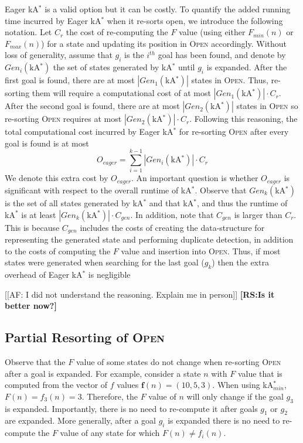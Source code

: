 \documentclass{aicom2e}
\newcommand{\kastar}{kA$^*$}
\newcommand{\kastarmin}{kA$^*_{min}$}
\newcommand{\minf}{$F_{min}(n)$}
\newcommand{\maxf}{$F_{max}(n)$}
\newcommand{\open}{\textsc{Open}}
\newcommand{\roni}[1]{\textbf{[RS:#1]}}
\begin{document}
Eager \kastar{} is a valid option but it can be costly. To quantify the added running time 
incurred by Eager \kastar{} when it re-sorts open, we introduce the following notation. 
Let $C_r$ the cost of re-computing the $F$ value (using either \minf{} or \maxf{}) for a state and updating its position in \open{} accordingly. Without loss of generality, assume that $g_i$ is the  $i^{th}$ goal has been found, and denote by $Gen_i(\text{\kastar{}})$ the set of  states generated by \kastar{} until $g_i$ is expanded. After the first goal is found, there are at most $|Gen_1(\text{\kastar{}})|$ states in \open{}. Thus, re-sorting them will require a computational cost of at most $|Gen_1(\text{\kastar{}})|\cdot C_r$. After the second goal is found, there
are at most $|Gen_2(\text{\kastar{}})|$ states in \open{} so re-sorting \open{} requires at most
$|Gen_2(\text{\kastar{}})|\cdot C_r$. Following this reasoning, the total computational
cost incurred by Eager \kastar{} for re-sorting \open{} after every goal is found is at most
\begin{equation}
O_{eager}=\sum_{i=1}^{k-1} |Gen_i(\text{\kastar{}})|\cdot C_r
\label{eq:re-sort-cost}
\end{equation}
We denote this extra cost by $O_{eager}$. 
An important question is whether $O_{eager}$ is significant with respect to the overall runtime of \kastar{}. Observe that $Gen_k(\text{\kastar{}})$ is the set of all states generated by \kastar{} 
and that \kastar{}, and thus the runtime of \kastar{} is at least 
$|Gen_k(\text{\kastar{}})|\cdot C_{gen}$. 
In addition, note that $C_{gen}$ is larger than $C_r$. 
This is because $C_{gen}$ includes the costs of creating the data-structure for representing the generated state and performing duplicate detection, 
in addition to the costs of computing the $F$ value and insertion into \open{}. 
Thus, if most states were generated when searching for the last goal ($g_k$) 
then the extra overhead of Eager \kastar{} is negligible 

[[AF: I did not understand the reasoning. Explain me in person]]
\roni{Is it better now?}

\subsection{Partial Resorting of \open{}}
Observe that the $F$ value of some states do not change when re-sorting \open{} after a goal is expanded. 
For example, consider a state $n$ with $F$ value that is computed from the vector of $f$ values $\textbf{f}(n)=(10,5,3)$. When using \kastarmin{}, $F(n)=f_3(n)=3$. Therefore, the $F$ value of $n$ will only change if the goal $g_3$ is expanded. Importantly, there is no need to re-compute it after goals $g_1$ or $g_2$ are expanded. More generally, after a goal $g_i$ is expanded there is no need to re-compute the $F$ value
of any state for which $F(n)\neq f_i(n)$. 
\end{document}
